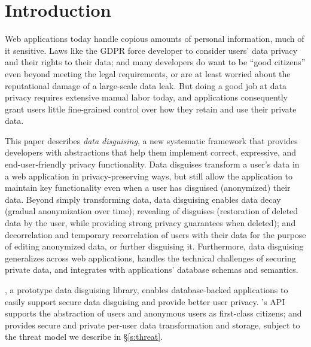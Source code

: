 \section{Introduction}
\label{s:intro}

%
Web applications today handle copious amounts of personal information, much of it sensitive.
%
%
Laws like the GDPR force developer to consider users' data privacy and their rights to their
data; and many developers do want to be ``good citizens'' even beyond meeting the legal
requirements, or are at least worried about the reputational damage of a large-scale data leak.
%
But doing a good job at data privacy requires extensive manual labor today, and applications
consequently grant users little fine-grained control over how they retain and use their private
data.
%

%
%

%
This paper describes \emph{data disguising}, a new systematic framework that provides
developers with abstractions that help them implement correct, expressive, and end-user-friendly
privacy functionality.
%
Data disguises transform a user's data in a web application in privacy-preserving ways, but still
allow the application to maintain key functionality even when a user has disguised (\ie anonymized)
their data.
%
Beyond simply transforming data, data disguising enables data decay (gradual anonymization over time);
revealing of disguises (restoration of deleted data by the user, while providing strong privacy
guarantees when deleted); and decorrelation and temporary recorrelation of users with their data for
the purpose of editing anonymized data, or further disguising it. 
%
Furthermore, data disguising generalizes across web applications, handles the technical challenges
of securing private data, and integrates with applications' database schemas and semantics.
%

\sys, a prototype data disguising library, enables database-backed applications to
easily support secure data disguising and provide better user privacy. \sys's API supports the
abstraction of users and anonymous users as first-class citizens; and provides secure and private
per-user data transformation and storage, subject to the threat model we describe in \S\ref{s:threat}.

